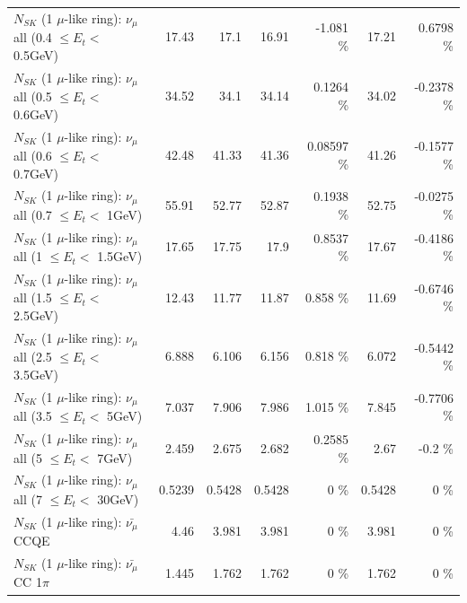 \begin{table}
\begin{tabular}{| l | r | r | r  r | r  r |}
       $N_{SK}$ (1 $\mu$-like ring): $\nu_{\mu}$ all (0.4 $\leq E_{t} <$ 0.5GeV) &           17.43 &            17.1 &           16.91 &   -1.081 \%  &           17.21 &   0.6798 \%  \\ 
       $N_{SK}$ (1 $\mu$-like ring): $\nu_{\mu}$ all (0.5 $\leq E_{t} <$ 0.6GeV) &           34.52 &            34.1 &           34.14 &   0.1264 \%  &           34.02 &  -0.2378 \%  \\ 
       $N_{SK}$ (1 $\mu$-like ring): $\nu_{\mu}$ all (0.6 $\leq E_{t} <$ 0.7GeV) &           42.48 &           41.33 &           41.36 &  0.08597 \%  &           41.26 &  -0.1577 \%  \\ 
         $N_{SK}$ (1 $\mu$-like ring): $\nu_{\mu}$ all (0.7 $\leq E_{t} <$ 1GeV) &           55.91 &           52.77 &           52.87 &   0.1938 \%  &           52.75 &  -0.0275 \%  \\ 
         $N_{SK}$ (1 $\mu$-like ring): $\nu_{\mu}$ all (1 $\leq E_{t} <$ 1.5GeV) &           17.65 &           17.75 &            17.9 &   0.8537 \%  &           17.67 &  -0.4186 \%  \\ 
       $N_{SK}$ (1 $\mu$-like ring): $\nu_{\mu}$ all (1.5 $\leq E_{t} <$ 2.5GeV) &           12.43 &           11.77 &           11.87 &    0.858 \%  &           11.69 &  -0.6746 \%  \\ 
       $N_{SK}$ (1 $\mu$-like ring): $\nu_{\mu}$ all (2.5 $\leq E_{t} <$ 3.5GeV) &           6.888 &           6.106 &           6.156 &    0.818 \%  &           6.072 &  -0.5442 \%  \\ 
         $N_{SK}$ (1 $\mu$-like ring): $\nu_{\mu}$ all (3.5 $\leq E_{t} <$ 5GeV) &           7.037 &           7.906 &           7.986 &    1.015 \%  &           7.845 &  -0.7706 \%  \\ 
           $N_{SK}$ (1 $\mu$-like ring): $\nu_{\mu}$ all (5 $\leq E_{t} <$ 7GeV) &           2.459 &           2.675 &           2.682 &   0.2585 \%  &            2.67 &     -0.2 \%  \\ 
          $N_{SK}$ (1 $\mu$-like ring): $\nu_{\mu}$ all (7 $\leq E_{t} <$ 30GeV) &          0.5239 &          0.5428 &          0.5428 &        0 \%  &          0.5428 &        0 \%  \\ 
\hline
\hline
\hline
                              $N_{SK}$ (1 $\mu$-like ring): $\bar{\nu_\mu}$ CCQE &            4.46 &           3.981 &           3.981 &        0 \%  &           3.981 &        0 \%  \\ 
                         $N_{SK}$ (1 $\mu$-like ring): $\bar{\nu_\mu}$ CC 1$\pi$ &           1.445 &           1.762 &           1.762 &        0 \%  &           1.762 &        0 \%  \\ 

\end{tabular}
\end{table}
